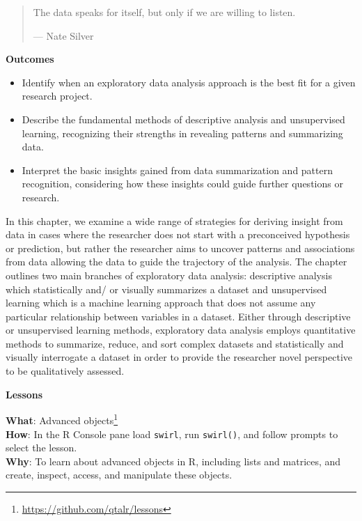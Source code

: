 \documentclass[
  letterpaper,
  DIV=11,
  numbers=noendperiod]{scrreprt}
\providecommand{\tightlist}{%
  \setlength{\itemsep}{0pt}\setlength{\parskip}{0pt}}\usepackage{longtable,booktabs,array}
\theoremstyle{definition}
\theoremstyle{remark}
\DeclareRobustCommand{\href}[2]{#2\footnote{\url{#1}}}
\begin{document}
\begin{quote}
The data speaks for itself, but only if we are willing to listen.

--- Nate Silver
\end{quote}

\begin{tcolorbox}[enhanced jigsaw, leftrule=.75mm, colframe=quarto-callout-color-frame, colback=white, rightrule=.15mm, opacityback=0, arc=.35mm, breakable, bottomrule=.15mm, left=2mm, toprule=.15mm]

\textbf{ Outcomes}

\begin{itemize}
\tightlist
\item
  Identify when an exploratory data analysis approach is the best fit
  for a given research project.
\item
  Describe the fundamental methods of descriptive analysis and
  unsupervised learning, recognizing their strengths in revealing
  patterns and summarizing data.
\item
  Interpret the basic insights gained from data summarization and
  pattern recognition, considering how these insights could guide
  further questions or research.
\end{itemize}

\end{tcolorbox}

In this chapter, we examine a wide range of strategies for deriving
insight from data in cases where the researcher does not start with a
preconceived hypothesis or prediction, but rather the researcher aims to
uncover patterns and associations from data allowing the data to guide
the trajectory of the analysis. The chapter outlines two main branches
of exploratory data analysis: descriptive analysis which statistically
and/ or visually summarizes a dataset and unsupervised learning which is
a machine learning approach that does not assume any particular
relationship between variables in a dataset. Either through descriptive
or unsupervised learning methods, exploratory data analysis employs
quantitative methods to summarize, reduce, and sort complex datasets and
statistically and visually interrogate a dataset in order to provide the
researcher novel perspective to be qualitatively assessed.

\begin{tcolorbox}[enhanced jigsaw, leftrule=.75mm, colframe=quarto-callout-color-frame, colback=white, rightrule=.15mm, opacityback=0, arc=.35mm, breakable, bottomrule=.15mm, left=2mm, toprule=.15mm]

\textbf{ Lessons}

\textbf{What}: \href{https://github.com/qtalr/lessons}{Advanced
objects}\\
\textbf{How}: In the R Console pane load \texttt{swirl}, run
\texttt{swirl()}, and follow prompts to select the lesson.\\
\textbf{Why}: To learn about advanced objects in R, including lists and
matrices, and create, inspect, access, and manipulate these objects.

\end{tcolorbox}
\end{document}
